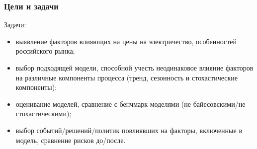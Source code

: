 \documentclass[c, dvipsnames]{beamer}  %
\begin{document}
\begin{frame}[shrink=3]
\frametitle{Цели и задачи} 







\begin{block}{Задачи:}


	\begin{itemize}
		
		\item  выявление факторов  влияющих на цены на электричество, особенностей российского рынка; 
		
		
		

				  
		\item  выбор подходящей модели, способной учесть неодинаковое    влияние факторов на различные компоненты процесса (тренд, сезонность и стохастические компоненты);
		  
 
		\item  оценивание моделей, сравнение с бенчмарк-моделями (не байесовскими/не стохастическими);
		
		\item  выбор событий/решений/политик повлиявших на факторы, включенные в модель, сравнение рисков до/после. 


\end{itemize}
\end{block}
\end{frame}
\end{document}
